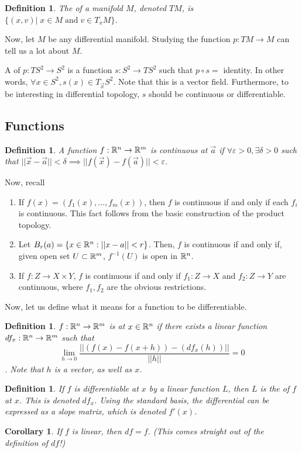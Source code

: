 \documentclass[11pt]{amsbook}
\theoremstyle{mystyle} \newtheorem{thrm}[thm]{Theorem}
\theoremstyle{mystyle} \newtheorem{defi}[thm]{Definition}
\theoremstyle{mystyle} \newtheorem{coro}[thm]{Corollary}
\theoremstyle{mystyle} \newtheorem{propo}[thm]{Proposition}
\theoremstyle{mystyle} \newtheorem{lemm}[thm]{Lemma}
\numberwithin{thm}{section}
\renewcommand{\epsilon}{\varepsilon}
\begin{document}
\begin{defi}
	The  of a manifold $M$, denoted $TM$, is $\{ (x,v) |\; x \in M \;\text{and}\; v \in T_xM \}$.
\end{defi}

Now, let $M$ be any differential manifold. Studying the function $p: TM \to M$
can tell us a lot about $M$.

\begin{example}
	A  of $p: TS^2 \to S^2$ is a function $s: S^2 \to TS^2$ such
	that $p \circ s =$ identity. In other words, $\forall x \in S^2, s(x) \in
	T_{\vec{x}}S^2$. Note that this is a vector field. Furthermore, to be
	interesting in differential topology, $s$ should be continuous or
	differentiable.
\end{example}



\subsection{Functions}

\begin{defi}
	A function $f: {\mathbb R}^n \to {\mathbb R}^m$ is continuous at $\vec{a}$ if $\forall
	\epsilon > 0, \exists \delta > 0$ such that $||\vec{x}-\vec{a}|| < \delta
	\implies ||f(\vec{x}) - f(\vec{a})|| < \epsilon$.
\end{defi}
Now, recall \begin{enumerate}
	\item If $f(x) = (f_1(x), \ldots, f_m(x))$, then $f$ is continuous if and
		only if each $f_i$ is continuous. This fact follows from the basic
		construction of the product topology.
	\item Let $B_r(a) = \{x \in {\mathbb R}^n : ||x-a|| < r\}$. Then, $f$ is continuous
		if and only if, given open set $U \subset {\mathbb R}^m$, $f^{-1}(U)$ is open in
		${\mathbb R}^n$.
	\item If $f: Z \to X \times Y$, $f$ is continuous if and only if $f_1: Z
		\to X$ and $f_2: Z \to Y$ are continuous, where $f_1, f_2$ are the
		obvious restrictions.
\end{enumerate}

Now, let us define what it means for a function to be differentiable.
\begin{defi}
	$f :{\mathbb R}^n \to {\mathbb R}^m$ is  at $x \in {\mathbb R}^n$ if there exists a linear function $df_x : {\mathbb R}^n \to {\mathbb R}^m$  such that $$\lim_{h \to 0} \frac{|| (f(x)-f(x+h)) - (df_x(h)) ||}{||h||} = 0$$.  Note that $h$ is a vector, as well as $x$.
\end{defi}
\begin{defi}
	If $f$ is differentiable at $x$ by a linear function $L$, then $L$ is the  of $f$ at $x$.  This is denoted $df_x$.  Using the standard basis, the differential can be expressed as a slope matrix, which is denoted $f'(x)$.
\end{defi}
\begin{coro}
	If $f$ is linear, then $df = f$.  (This comes straight out of the definition of $df$!)
\end{coro}
\end{document}
